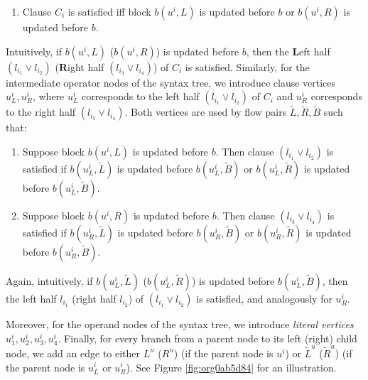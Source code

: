 \documentclass[fontsize=11pt,paper=a4]{book}
\begin{document}
\begin{enumerate}[label=(C\arabic*)]
\item\label{itm:c1}
Clause \(C_i\) is satisfied iff block \(b(u^i,L)\) is updated before \(b\) or \(b(u^i,R)\) is updated before \(b\).
\end{enumerate}

Intuitively, if \(b(u^i,L)\) (\(b(u^i,R)\)) is updated before \(b\), then the \(\textbf{L}\)eft half \((l_{i_1}\vee l_{i_2})\) (\(\textbf{R}\)ight half \((l_{i_3}\vee l_{i_4})\)) of \(C_i\) is satisfied.
Similarly, for the intermediate operator nodes of the syntax tree, we introduce clause vertices \(u_L^i,u_R^i\), where \(u_L^i\) corresponds to the left half \((l_{i_1}\vee l_{i_2})\) of \(C_i\) and \(u_R^i\) corresponds to the right half \((l_{i_3}\vee l_{i_4})\).
Both vertices are used by flow pairs \(\tilde{L},\tilde{R},\tilde{B}\) such that:

\begin{enumerate}[label=(C\arabic*),start=2]
\item\label{itm:c2}
Suppose block \(b(u^i,L)\) is updated before \(b\).
Then clause \((l_{i_1}\vee l_{i_2})\) is satisfied if \(b(u_L^i,\tilde{L})\) is updated before \(b(u_L^i,\tilde{B})\) or \(b(u_L^i,\tilde{R})\) is updated before \(b(u_L^i,\tilde{B})\).
\item\label{itm:c3}
Suppose block \(b(u^i,R)\) is updated before \(b\).
Then clause \((l_{i_3}\vee l_{i_4})\) is satisfied if \(b(u_R^i,\tilde{L})\) is updated before \(b(u_R^i,\tilde{B})\) or \(b(u_R^i,\tilde{R})\) is updated before \(b(u_R^i,\tilde{B})\).
\end{enumerate}

Again, intuitively, if \(b(u_L^i,\tilde{L})\) (\(b(u_L^i,\tilde{R})\)) is updated before \(b(u_L^i,\tilde{B})\), then the left half \(l_{i_1}\) (right half \(l_{i_2}\)) of \((l_{i_1}\vee l_{i_2})\) is satisfied, and analogously for \(u_R^i\).

Moreover, for the operand nodes of the syntax tree, we introduce \emph{literal vertices} \(u_1^i,u_2^i,u_3^i,u_4^i\).
Finally, for every branch from a parent node to its left (right) child node, we add an edge to either \(L^u\) (\(R^u\)) (if the parent node is \(u^i\)) or \(\tilde{L}^u\) (\(\tilde{R}^u\)) (if the parent node is \(u_L^i\) or \(u_R^i\)).
See Figure \ref{fig:org0ab5d84} for an illustration.
\end{document}
